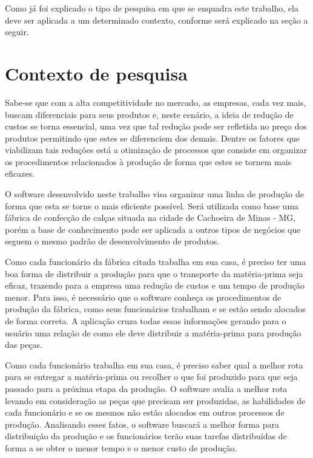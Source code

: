 \par Como já foi explicado o tipo de pesquisa em que se enquadra este trabalho,
ela deve ser aplicada a um determinado contexto, conforme será explicado na
seção a seguir.

\section{Contexto de pesquisa}

\par Sabe-se que com a alta competitividade no mercado, as empresas, cada vez mais,
buscam diferenciais para seus produtos e, neste cenário, a ideia
de redução de custos se torna essencial, uma vez que tal redução pode ser
refletida no preço dos produtos permitindo que estes se diferenciem dos demais.
Dentre os fatores que viabilizam tais reduções está a otimização de processos que
consiste em organizar os procedimentos relacionados à produção de forma que
estes se tornem mais eficazes.

\par O software desenvolvido neste trabalho visa organizar uma linha de produção
de forma que esta se torne o mais eficiente possível. Será utilizada como
base uma fábrica de confecção de calças situada na cidade de
Cachoeira de Minas - MG, porém a base de conhecimento pode ser aplicada a outros
tipos de negócios que seguem o mesmo padrão de desenvolvimento de produtos.

\par Como cada funcionário da fábrica citada trabalha em sua casa, é preciso ter
uma boa forma de distribuir a produção para que o transporte da matéria-prima
seja eficaz, trazendo para a empresa uma redução de custos e um tempo de
produção menor.
Para isso, é necessário que o software conheça os procedimentos de
produção da fábrica, como seus funcionários trabalham e se estão sendo alocados
de forma correta. A aplicação cruza todas essas informações gerando para o
usuário uma relação de como ele deve distribuir a matéria-prima para produção
das peças.

\par Como cada funcionário trabalha em sua casa, é preciso saber qual a
melhor rota para se entregar a matéria-prima ou recolher o que foi produzido
para que seja passado para a próxima etapa da produção. O software avalia a
melhor rota levando em consideração as peças que precisam ser produzidas, as
habilidades de cada funcionário e se os mesmos não estão alocados em outros
processos de produção. Analisando esses fatos, o software buscará a melhor forma
para distribuição da produção e os funcionários terão suas tarefas distribuídas
de forma a se obter o menor tempo e o  menor custo de produção.


